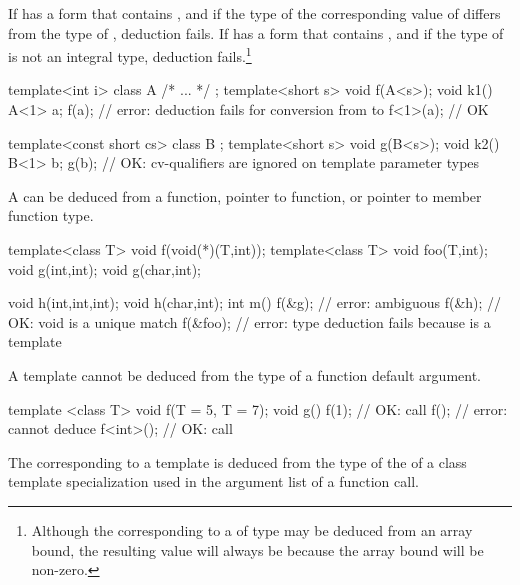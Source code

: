 \pnum
If  has a form that contains , and if the type of the
corresponding value of  differs from the type of , deduction
fails. If  has a form that contains \tcode{[i]}, and if the type of
 is not an integral type, deduction fails.\footnote{Although the
corresponding to a
of type
may be deduced from an array bound, the resulting value will always be
because the array bound will be non-zero.}
\enterexample

\begin{codeblock}
template<int i> class A { /* ... */ };
template<short s> void f(A<s>);
void k1() {
  A<1> a;
  f(a);             // error: deduction fails for conversion from  to 
  f<1>(a);          // OK
}

template<const short cs> class B { };
template<short s> void g(B<s>);
void k2() {
  B<1> b;
  g(b);             // OK: cv-qualifiers are ignored on template parameter types
}
\end{codeblock}
\exitexample

\pnum
A
can be deduced from a function, pointer to function, or pointer to
member function type.

\enterexample

\begin{codeblock}
template<class T> void f(void(*)(T,int));
template<class T> void foo(T,int);
void g(int,int);
void g(char,int);

void h(int,int,int);
void h(char,int);
int m() {
  f(&g);            // error: ambiguous
  f(&h);            // OK: void  is a unique match
  f(&foo);          // error: type deduction fails because  is a template
}
\end{codeblock}
\exitexample

\pnum
A template
cannot be deduced from the type of a function default argument.
\enterexample

\begin{codeblock}
template <class T> void f(T = 5, T = 7);
void g() {
  f(1);             // OK: call 
  f();              // error: cannot deduce 
  f<int>();         // OK: call 
}
\end{codeblock}
\exitexample

\pnum
The
corresponding to a template
is deduced from the type of the
of a class template specialization used in the argument list of a function call.
\enterexample

